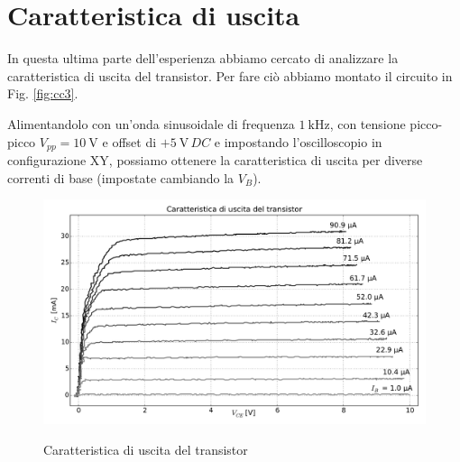 \section{Caratteristica di uscita}

In questa ultima parte dell'esperienza abbiamo cercato di analizzare la caratteristica di uscita del transistor.
Per fare ciò abbiamo montato il circuito in Fig. \ref{fig:cc3}.

Alimentandolo con un'onda sinusoidale di frequenza $\SI{1}{\kilo\hertz}$, con tensione picco-picco $V_{pp} = \SI{10}{\volt}$ e offset di $+\SI{5}{\volt} \, DC$ e impostando l'oscilloscopio in configurazione XY, possiamo ottenere la caratteristica di uscita per diverse correnti di base (impostate cambiando la $V_B$).

\begin{figure}[h]
\centering
	\caption{Caratteristica di uscita del transistor}
	\includegraphics[scale=0.45]{xy.pdf}
	\label{fig:xy}
\end{figure}